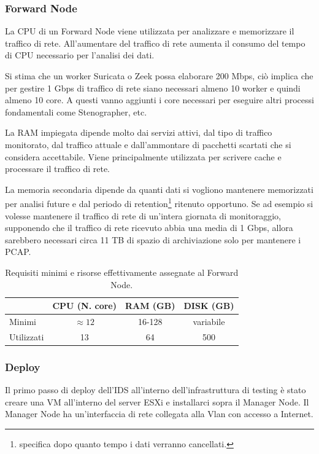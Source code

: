 \subsubsection*{Forward Node}
La CPU di un Forward Node viene utilizzata per analizzare e memorizzare il traffico di rete. All'aumentare del traffico di rete aumenta il consumo del tempo di CPU necessario per l'analisi dei dati. 

Si stima che un worker Suricata o Zeek possa elaborare 200 Mbps, ciò implica che per gestire 1 Gbps di traffico di rete siano necessari almeno 10 worker e quindi almeno 10 core. A questi vanno aggiunti i core necessari per eseguire altri processi fondamentali come Stenographer, etc.

La RAM impiegata dipende molto dai servizi attivi, dal tipo di traffico monitorato, dal traffico attuale e dall'ammontare di pacchetti scartati che si considera accettabile. Viene principalmente utilizzata per scrivere cache e processare il traffico di rete.

La memoria secondaria dipende da quanti dati si vogliono mantenere memorizzati per analisi future e dal periodo di retention\footnote{specifica dopo quanto tempo i dati verranno cancellati.} ritenuto opportuno.
Se ad esempio si volesse mantenere il traffico di rete di un'intera giornata di monitoraggio, supponendo che il traffico di rete ricevuto abbia una media di 1 Gbps, allora sarebbero necessari circa 11 TB di spazio di archiviazione solo per mantenere i PCAP.

\begin{table}[hbtp]
    \centering
    \begin{tabular}{|l|c|c|c|}
        \hline
        & CPU (N. core) & RAM (GB) & DISK (GB) \\
        \hline
        Minimi     & $\approx 12$ & 16-128 & variabile   \\
        \hline
        Utilizzati & 13   & 64  & 500 \\
        \hline
    \end{tabular}
    \caption{Requisiti minimi e risorse effettivamente assegnate al Forward Node.}
    \label{tab:requisitiHw3}
\end{table}


\vspace{7mm}
\subsubsection*{Deploy}
Il primo passo di deploy dell'IDS all'interno dell'infrastruttura di testing è stato creare una VM all'interno del server ESXi e installarci sopra il Manager Node. Il Manager Node ha un'interfaccia di rete collegata alla Vlan con accesso a Internet.


